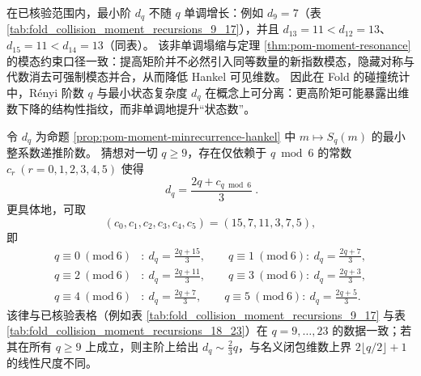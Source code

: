 \begin{remark}\label{rem:pom-moment-order-collapse-nonmonotone}
在已核验范围内，最小阶 \(d_q\) 不随 \(q\) 单调增长：例如 \(d_9=7\)（表 \ref{tab:fold_collision_moment_recursions_9_17}），并且 \(d_{13}=11<d_{12}=13\)、\(d_{15}=11<d_{14}=13\)（同表）。
该非单调塌缩与定理 \ref{thm:pom-moment-resonance} 的模态约束口径一致：提高矩阶并不必然引入同等数量的新指数模态，隐藏对称与代数消去可强制模态并合，从而降低 Hankel 可见维数。
因此在 Fold 的碰撞统计中，Rényi 阶数 \(q\) 与最小状态复杂度 \(d_q\) 在概念上可分离：更高阶矩可能暴露出维数下降的结构性指纹，而非单调地提升“状态数”。
\end{remark}

\begin{conjecture}\label{conj:pom-moment-order-two-thirds-slope-affine-6period}
令 \(d_q\) 为命题 \ref{prop:pom-moment-minrecurrence-hankel} 中 \(m\mapsto S_q(m)\) 的最小整系数递推阶数。
猜想对一切 \(q\ge 9\)，存在仅依赖于 \(q\bmod 6\) 的常数 \(c_r\ (r=0,1,2,3,4,5)\) 使得
\[
\boxed{\ d_q=\frac{2q+c_{q\bmod 6}}{3}\ }.
\]
更具体地，可取
\[
(c_0,c_1,c_2,c_3,c_4,c_5)=(15,7,11,3,7,5),
\]
即
\[
\begin{aligned}
q\equiv 0\ (\mathrm{mod}\ 6)&:\ d_q=\frac{2q+15}{3},\qquad
q\equiv 1\ (\mathrm{mod}\ 6):\ d_q=\frac{2q+7}{3},\\
q\equiv 2\ (\mathrm{mod}\ 6)&:\ d_q=\frac{2q+11}{3},\qquad
q\equiv 3\ (\mathrm{mod}\ 6):\ d_q=\frac{2q+3}{3},\\
q\equiv 4\ (\mathrm{mod}\ 6)&:\ d_q=\frac{2q+7}{3},\qquad
q\equiv 5\ (\mathrm{mod}\ 6):\ d_q=\frac{2q+5}{3}.
\end{aligned}
\]
该律与已核验表格（例如表 \ref{tab:fold_collision_moment_recursions_9_17} 与表 \ref{tab:fold_collision_moment_recursions_18_23}）在 \(q=9,\dots,23\) 的数据一致；若其在所有 \(q\ge 9\) 上成立，则主阶上给出
\(
d_q\sim \frac{2}{3}q
\)，与名义闭包维数上界 \(2\lfloor q/2\rfloor+1\) 的线性尺度不同。
\end{conjecture}

